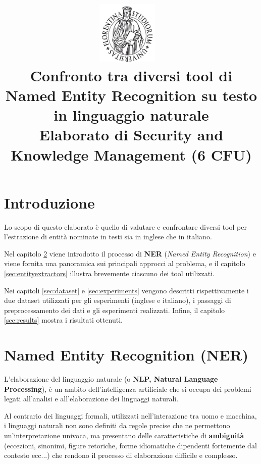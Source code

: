 \documentclass[a4paper,11pt]{article}
\begin{document}
\title{
\includegraphics[height=30mm]{./unifi/stemma}~\\[0.5cm]
\LARGE Confronto tra diversi tool di Named Entity Recognition su testo in linguaggio naturale \\[0.5cm]
\normalsize Elaborato di Security and Knowledge Management (6 CFU)
}
\date{}
\maketitle

\tableofcontents
\clearpage

\section{Introduzione}
Lo scopo di questo elaborato è quello di valutare e confrontare diversi tool per l'estrazione di entità nominate in testi sia in inglese che in italiano. 

Nel capitolo \ref{sec:ner} viene introdotto il processo di \textbf{NER} (\textit{Named Entity Recognition}) e viene fornita una panoramica sui principali approcci al problema, e il capitolo \ref{sec:entityextractors} illustra brevemente ciascuno dei tool utilizzati.

Nei capitoli \ref{sec:dataset} e \ref{sec:experiments} vengono descritti rispettivamente i due dataset utilizzati per gli esperimenti (inglese e italiano), i passaggi di preprocessamento dei dati e gli esperimenti realizzati. Infine, il capitolo \ref{sec:results} mostra i risultati ottenuti.

\section{Named Entity Recognition (NER)}
\label{sec:ner}

L'elaborazione del linguaggio naturale (o \textbf{NLP, Natural Language Processing}), è un ambito dell’intelligenza artificiale che si occupa dei problemi legati all’analisi e all’elaborazione dei linguaggi naturali. \cite{wiki:nlp}
 
Al contrario dei linguaggi formali, utilizzati nell’interazione tra uomo e macchina, i linguaggi naturali non sono definiti da regole precise che ne permettono un’interpretazione univoca, ma presentano delle caratteristiche di \textbf{ambiguità} (eccezioni, sinonimi, figure retoriche, forme idiomatiche dipendenti fortemente dal contesto ecc...) che rendono il processo di elaborazione difficile e complesso. 
\end{document}
